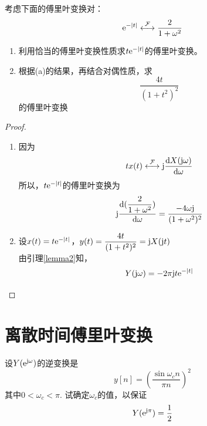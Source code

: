 \begin{proposition}

    考虑下面的傅里叶变换对：
    $$\mathrm{e}^{-|t|} \stackrel{\mathcal{F}}{\longleftrightarrow} \dfrac{2}{1 + \omega^2}$$

    \begin{enumerate}

        \item 利用恰当的傅里叶变换性质求$t\mathrm{e}^{-|t|}$的傅里叶变换。
        \item 根据(a)的结果，再结合对偶性质，求
              $$\dfrac{4t}{(1+t^2)^2}$$
              的傅里叶变换

    \end{enumerate}

\end{proposition}

\begin{proof}

    \begin{enumerate}

        \item 
            因为
            $$tx(t) \stackrel{\mathcal{F}}{\longleftrightarrow} \mathrm{j} \dfrac{\mathrm{d} X(\mathrm{j} \omega)}{\mathrm{d} \omega}$$
            所以，$t\mathrm{e}^{-|t|}$的傅里叶变换为
            $$\mathrm{j} \dfrac{\mathrm{d} (\dfrac{2}{1 + \omega^2})}{\mathrm{d} \omega} = \dfrac{-4\omega \mathrm{j}}{(1 + \omega^2)^2}$$
        \item 
            设$x(t) = t\mathrm{e}^{-|t|}$，$y(t) = \dfrac{4t}{(1+t^2)^2} = \mathrm{j} X(\mathrm{j} t)$\\
            由引理\ref{lemma2}知，
            $$Y(\mathrm{j} \omega) = -2 \pi \mathrm{j} t \mathrm{e}^{-|t|}$$

    \end{enumerate}

\end{proof}

\section{离散时间傅里叶变换}

\begin{proposition}
    
    设$Y(\mathrm{e}^{\mathrm{j} \omega})$的逆变换是
    $$y[n] = \left(\dfrac{\sin{\omega_c n}}{\pi n}\right)^2$$
    其中$0 < \omega_c < \pi$. 试确定$\omega_c$的值，以保证
    $$Y(\mathrm{e}^{\mathrm{j} \pi}) = \dfrac{1}{2}$$

\end{proposition}

